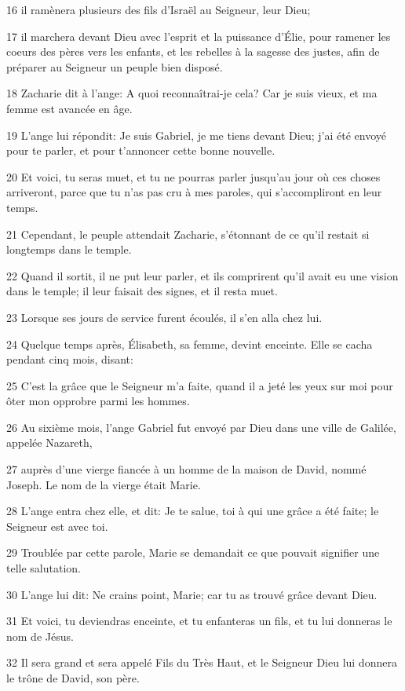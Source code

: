 \par 16 il ramènera plusieurs des fils d'Israël au Seigneur, leur Dieu;
\par 17 il marchera devant Dieu avec l'esprit et la puissance d'Élie, pour ramener les coeurs des pères vers les enfants, et les rebelles à la sagesse des justes, afin de préparer au Seigneur un peuple bien disposé.
\par 18 Zacharie dit à l'ange: A quoi reconnaîtrai-je cela? Car je suis vieux, et ma femme est avancée en âge.
\par 19 L'ange lui répondit: Je suis Gabriel, je me tiens devant Dieu; j'ai été envoyé pour te parler, et pour t'annoncer cette bonne nouvelle.
\par 20 Et voici, tu seras muet, et tu ne pourras parler jusqu'au jour où ces choses arriveront, parce que tu n'as pas cru à mes paroles, qui s'accompliront en leur temps.
\par 21 Cependant, le peuple attendait Zacharie, s'étonnant de ce qu'il restait si longtemps dans le temple.
\par 22 Quand il sortit, il ne put leur parler, et ils comprirent qu'il avait eu une vision dans le temple; il leur faisait des signes, et il resta muet.
\par 23 Lorsque ses jours de service furent écoulés, il s'en alla chez lui.
\par 24 Quelque temps après, Élisabeth, sa femme, devint enceinte. Elle se cacha pendant cinq mois, disant:
\par 25 C'est la grâce que le Seigneur m'a faite, quand il a jeté les yeux sur moi pour ôter mon opprobre parmi les hommes.
\par 26 Au sixième mois, l'ange Gabriel fut envoyé par Dieu dans une ville de Galilée, appelée Nazareth,
\par 27 auprès d'une vierge fiancée à un homme de la maison de David, nommé Joseph. Le nom de la vierge était Marie.
\par 28 L'ange entra chez elle, et dit: Je te salue, toi à qui une grâce a été faite; le Seigneur est avec toi.
\par 29 Troublée par cette parole, Marie se demandait ce que pouvait signifier une telle salutation.
\par 30 L'ange lui dit: Ne crains point, Marie; car tu as trouvé grâce devant Dieu.
\par 31 Et voici, tu deviendras enceinte, et tu enfanteras un fils, et tu lui donneras le nom de Jésus.
\par 32 Il sera grand et sera appelé Fils du Très Haut, et le Seigneur Dieu lui donnera le trône de David, son père.
